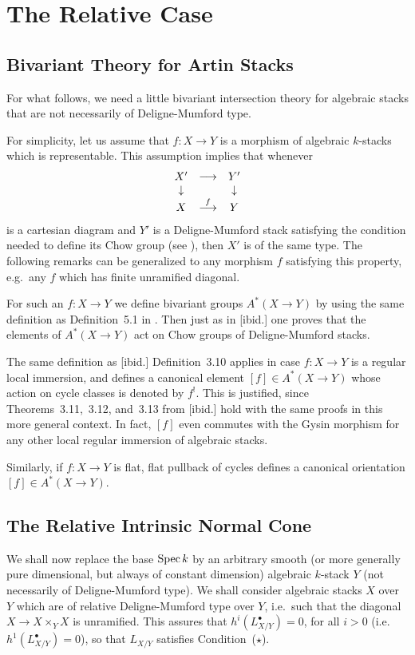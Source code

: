 \documentclass[11pt]{article}
\theoremstyle{plain}
\theoremstyle{definition}
\newcommand{\upst}{^{\ast}}
\newcommand{\upsh}{^{!}}
\newcommand{\com}{^{\scriptscriptstyle\bullet}}
\newcommand{\spec}{\mathop{\rm Spec}\nolimits}
\newcommand{\ldiag}[1]
       {\makebox[0cm]{\({\scriptstyle#1}\downarrow\phantom{\scriptstyle#1}\)}}
\newcommand{\rdiag}[1]
       {\makebox[0cm]{\(\phantom{\scriptstyle#1}\downarrow{\scriptstyle#1}\)}}
\newcommand{\comdia}[9]{
\begin{array}{ccc}
#1 & \stackrel{#2}{\longrightarrow} & #3 \\
\ldiag{#4} & #5 & \rdiag{#6} \\
#7 & \stackrel{#8}{\longrightarrow} & #9
\end{array}}
\theoremstyle{plain}
\theoremstyle{definition}
\theoremstyle{remark}
\begin{document}
\section{The Relative Case}

\subsection{Bivariant Theory for Artin Stacks}

For what follows, we need a little bivariant intersection theory for
algebraic stacks that are not necessarily of Deligne-Mumford type.

For simplicity, let us assume that \(f:X\to Y\) is a morphism of
algebraic \(k\)-stacks which is representable. This assumption implies
that whenever
\[
\comdia{X'}{}{Y'}{}{}{}{X}{f}{Y}
\]
is a cartesian diagram and \(Y'\) is a Deligne-Mumford stack satisfying
the condition needed to define its Chow group (see \cite{vistoli}),
then \(X'\) is of the same type.  The following remarks can be
generalized to any morphism \(f\) satisfying this property, e.g.\ any
\(f\) which has finite unramified diagonal.

For such an \(f:X\to Y\) we define bivariant groups \(A\upst(X\to Y)\) by
using the same definition as Definition~5.1 in \cite{vistoli}. Then
just as in [ibid.] one proves that the elements of \(A\upst(X\to Y)\)
act on Chow groups of Deligne-Mumford stacks.

The same definition as [ibid.] Definition~3.10 applies in case \(f:X\to
Y\) is a regular local immersion, and defines a canonical element
\([f]\in A\upst(X\to Y)\) whose action on cycle classes is denoted by
\(f\upsh\). This is justified, since Theorems~3.11,~3.12, and~3.13 from
[ibid.] hold with the same proofs in this more general context. In
fact, \([f]\) even commutes with the Gysin morphism for any other local
regular immersion of algebraic stacks.

Similarly, if \(f:X\to Y\) is flat, flat pullback of cycles defines a
canonical orientation \([f]\in A\upst(X\to Y)\).

\subsection{The Relative Intrinsic Normal Cone}

We shall now replace the base \(\spec k\) by an arbitrary smooth (or
more generally pure dimensional, but always of constant dimension)
algebraic \(k\)-stack \(Y\) (not necessarily of Deligne-Mumford type). We
shall consider algebraic stacks \(X\) over \(Y\) which are of relative
Deligne-Mumford type over \(Y\), i.e.\ such that the diagonal
\(X\rightarrow X\times_Y X\) is unramified. This assures that
\(h^i(L_{X/Y}\com)=0\), for all \(i>0\) (i.e.\ \(h^1(L_{X/Y}\com)=0\)), so
that \(L_{X/Y}\) satisfies Condition~(\(\star\)).
\end{document}
